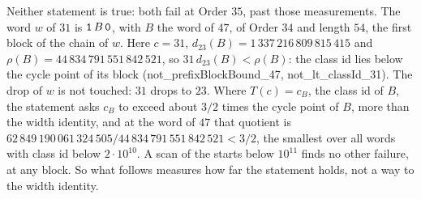 \documentclass[10pt,a4paper,titlepage]{article}
\newcommand{\lean}[1]{\textsf{#1}}
\begin{document}
Neither statement is true: both fail at Order $35$, past those measurements. The word $w$ of
$31$ is $\text{\texttt{1}}\,B\,\text{\texttt{0}}$, with $B$ the word of $47$, of Order $34$ and length $54$, the first
block of the chain of $w$. Here $c = 31$, $d_{23}(B) = 1\,337\,216\,809\,815\,415$ and
$\rho(B) = 44\,834\,791\,551\,842\,521$, so $31\,d_{23}(B) < \rho(B)$: the class id lies below the
cycle point of its block (\lean{not\_prefixBlockBound\_47}, \lean{not\_lt\_classId\_31}).
The drop of $w$ is not touched: $31$ drops to $23$. Where $T(c) = c_B$, the class id of $B$, the statement asks
$c_B$ to exceed about $3/2$ times the cycle point of $B$, more than the width identity, and at
the word of $47$ that quotient is $62\,849\,190\,061\,324\,505/44\,834\,791\,551\,842\,521 < 3/2$, the
smallest over all words with class id below $2 \cdot 10^{10}$. A scan of the starts below $10^{11}$ finds no other
failure, at any block. So what follows measures how far the statement holds, not a way
to the width identity.
\end{document}
